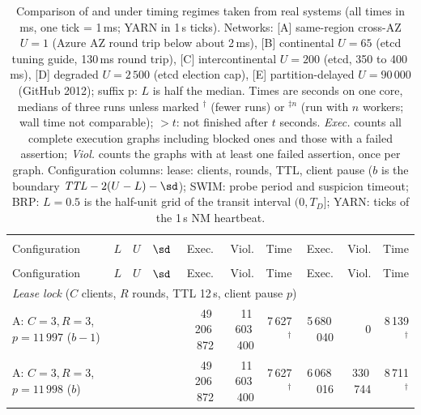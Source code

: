 \begingroup\footnotesize\setlength{\tabcolsep}{2pt}
\begin{longtable}{@{}l*{3}{>{\centering\arraybackslash}p{3.2em}}rrrrrr@{}}
\caption{Comparison of \must{} and \tool{} under timing regimes taken from real systems (all times in ms, one tick = 1\,ms; YARN in 1\,s ticks). Networks: [A] same-region cross-AZ $U{=}1$ (Azure AZ round trip below about 2\,ms), [B] continental $U{=}65$ (etcd tuning guide, 130\,ms round trip), [C] intercontinental $U{=}200$ (etcd, 350 to 400\,ms), [D] degraded $U{=}2\,500$ (etcd election cap), [E] partition-delayed $U{=}90\,000$ (GitHub 2012); suffix p: $L$ is half the median. Times are seconds on one core, medians of three runs unless marked $^\dagger$ (fewer runs) or $^{\ddagger n}$ (run with $n$ workers; wall time not comparable); $>t$: not finished after $t$ seconds. \emph{Exec.} counts all complete execution graphs including blocked ones and those with a failed assertion; \emph{Viol.} counts the graphs with at least one failed assertion, once per graph. Configuration columns: lease: clients, rounds, TTL, client pause ($b$ is the boundary $\mathit{TTL}-2(U-L)-\sd$); SWIM: probe period and suspicion timeout; BRP: $L{=}0.5$ is the half-unit grid of the transit interval $(0,T_D]$; YARN: ticks of the 1\,s NM heartbeat.}\label{tab:evaluation-full}\\
    \toprule
    & \multicolumn{3}{c}{Timing} & \multicolumn{3}{c}{\must{}} & \multicolumn{3}{c}{\tool{}} \\
    \cmidrule(lr){2-4}\cmidrule(lr){5-7}\cmidrule(l){8-10}
    Configuration & $L$ & $U$ & $\sd$ & Exec. & Viol. & Time & Exec. & Viol. & Time \\
    \midrule
\endfirsthead
    \toprule
    & \multicolumn{3}{c}{Timing} & \multicolumn{3}{c}{\must{}} & \multicolumn{3}{c}{\tool{}} \\
    \cmidrule(lr){2-4}\cmidrule(lr){5-7}\cmidrule(l){8-10}
    Configuration & $L$ & $U$ & $\sd$ & Exec. & Viol. & Time & Exec. & Viol. & Time \\
    \midrule
\endhead
    \multicolumn{10}{l}{\emph{Lease lock} ($C$ clients, $R$ rounds, TTL 12\,s, client pause $p$)} \\
    \quad A: $C{=}3,R{=}3$, $p{=}11\,997$ ($b{-}1$) & 0 & 1 & 0 & 49\,206\,872 & 11\,603\,400 & 7\,627$^\dagger$ & 5\,680\,040 & 0 & 8\,139$^\dagger$ \\
    \quad A: $C{=}3,R{=}3$, $p{=}11\,998$ ($b$) & 0 & 1 & 0 & 49\,206\,872 & 11\,603\,400 & 7\,627$^\dagger$ & 6\,068\,016 & 330\,744 & 8\,711$^\dagger$ \\

\end{longtable}
